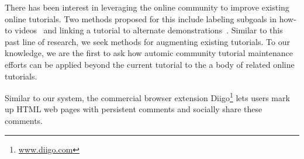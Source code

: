 There has been interest in leveraging the online community to improve existing online tutorials.
Two methods proposed for this include labeling subgoals in how-to videos~\cite{kim_learnersourcing_2013} and linking a tutorial to alternate demonstrations~\cite{lafreniere_community_2013}.
Similar to this past line of research, we seek methods for augmenting existing tutorials.
To our knowledge, we are the first to ask how automic community tutorial maintenance efforts can be applied beyond the current tutorial to the a body of related online tutorials.

Similar to our system, the commercial browser extension Diigo\footnote{\url{www.diigo.com}} lets users mark up HTML web pages with persistent comments and socially share these comments.
